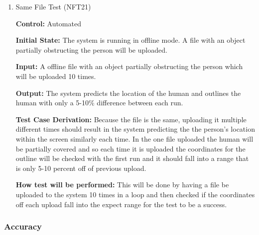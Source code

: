 \documentclass[12pt, titlepage]{article}
\begin{document}
\begin{enumerate}

\item{Same File Test (NFT21)\label{NFT21}\\}
  
\textbf{Control:} Automated

\textbf{Initial State:} The system is running in offline mode. A file with an object partially obstructing the person will be uploaded.

\textbf{Input:} A offline file with an object partially obstructing the person which will be uploaded 10 times.

\textbf{Output:} The system predicts the location of the human and outlines the human with only a 5-10\% difference between each run.

\textbf{Test Case Derivation:} Because the file is the same, uploading it multiple different times should result in the system predicting the the person's location within the screen similarly each time. In the one file uploaded the human will be partially covered and so each time it is uploaded the coordinates for the outline will be checked with the first run and it should fall into a range that is only 5-10 percent off of previous upload.

\textbf{How test will be performed:} This will be done by having a file be uploaded to the system 10 times in a loop and then checked if the coordinates off each upload fall into the expect range for the test to be a success. 
  
\end{enumerate}

\subsubsection{Accuracy}
\end{document}
